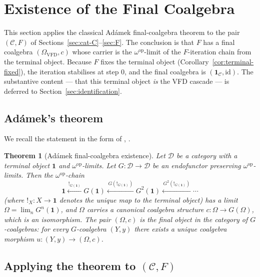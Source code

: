 \documentclass[11pt, a4paper]{amsart}
\newtheorem{theorem}{Theorem}[section]
\theoremstyle{definition}
\newcommand{\catC}{\mathcal{C}}
\newcommand{\catD}{\mathcal{D}}
\newcommand{\Omegacap}{\Omega_{\mathrm{VFD}}}
\begin{document}
\section{Existence of the Final Coalgebra}
\label{sec:existence}

This section applies the classical Ad\'amek final-coalgebra
theorem \cite{Adamek1974, Rutten2000} to the pair $(\catC, F)$ of
Sections~\ref{sec:cat-C}--\ref{sec:F}. The conclusion is that $F$
has a final coalgebra $(\Omegacap, c)$ whose carrier is the
$\omega^{\mathrm{op}}$-limit of the $F$-iteration chain from the
terminal object. Because $F$ fixes the terminal object
(Corollary~\ref{cor:terminal-fixed}), the iteration stabilises
at step $0$, and the final coalgebra is $(\mathbf{1}_\catC,
\mathrm{id})$. The substantive content — that this terminal
object \emph{is} the VFD cascade — is deferred to
Section~\ref{sec:identification}.

\subsection{Ad\'amek's theorem}

We recall the statement in the form of
\cite[Thm.~2.1]{Adamek1974}, \cite[Thm.~7.1]{Rutten2000}.

\begin{theorem}[Ad\'amek final-coalgebra existence]
\label{thm:adamek-statement}
Let $\catD$ be a category with a terminal object $\mathbf{1}$ and
$\omega^{\mathrm{op}}$-limits. Let $G \colon \catD \to \catD$ be
an endofunctor preserving $\omega^{\mathrm{op}}$-limits. Then the
$\omega^{\mathrm{op}}$-chain
\[
    \mathbf{1} \xleftarrow{\,!_{G(\mathbf{1})}\,}
    G(\mathbf{1})
    \xleftarrow{\,G(!_{G(\mathbf{1})})\,}
    G^2(\mathbf{1})
    \xleftarrow{\,G^2(!_{G(\mathbf{1})})\,}
    \cdots
\]
(where $!_X \colon X \to \mathbf{1}$ denotes the unique map to
the terminal object) has a limit $\Omega = \lim_n G^n(\mathbf{1})$,
and $\Omega$ carries a canonical coalgebra structure
$c \colon \Omega \to G(\Omega)$, which is an isomorphism. The
pair $(\Omega, c)$ is the final object in the category of
$G$-coalgebras: for every $G$-coalgebra $(Y, y)$ there exists a
unique coalgebra morphism $u \colon (Y, y) \to (\Omega, c)$.
\end{theorem}

\subsection{Applying the theorem to $(\catC, F)$}
\end{document}
